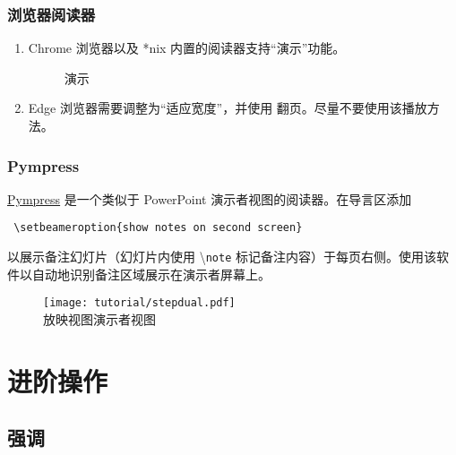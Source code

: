 \documentclass[
    UTF8,
    heading=true,
    12pt,
    a4paper
]{ctexrep}
\newcommand{\cmd}[1]{\textbackslash{}\texttt{#1}}
\begin{document}
\section{浏览器阅读器}

\begin{enumerate}
  \item[\faChrome] Chrome 浏览器以及 *nix 内置的阅读器支持“演示”功能。
    \begin{figure}[h]
      \centering
      \begin{tcolorbox}[enhanced, title={$\vdots$}, attach boxed title to top right, boxed title style={circular arc,top=0mm,bottom=2mm,left=3.25mm,right=3.25mm}, sharp corners, tile, width=6cm]
        演示
      \end{tcolorbox}
    \end{figure}
  \item[\faInternetExplorer] Edge 浏览器需要调整为“适应宽度”\fbox{\faArrowsAltH}，并使用  翻页。尽量不要使用该播放方法。
\end{enumerate}

\section{Pympress}

\href{https://github.com/Cimbali/pympress}{Pympress} 是一个类似于 PowerPoint
演示者视图的阅读器。在导言区添加
\begin{verbatim}
 \setbeameroption{show notes on second screen}
\end{verbatim}
以展示备注幻灯片（幻灯片内使用 \cmd{note} 标记备注内容）于每页右侧。使用该软件以自动地识别备注区域展示在演示者屏幕上。


\begin{figure}[h]
  \centering
  \texttt{[image: tutorial/stepdual.pdf]}\\
  放映视图\hspace{6em}演示者视图
\end{figure}


\part{进阶操作}

\chapter{强调}
\end{document}
